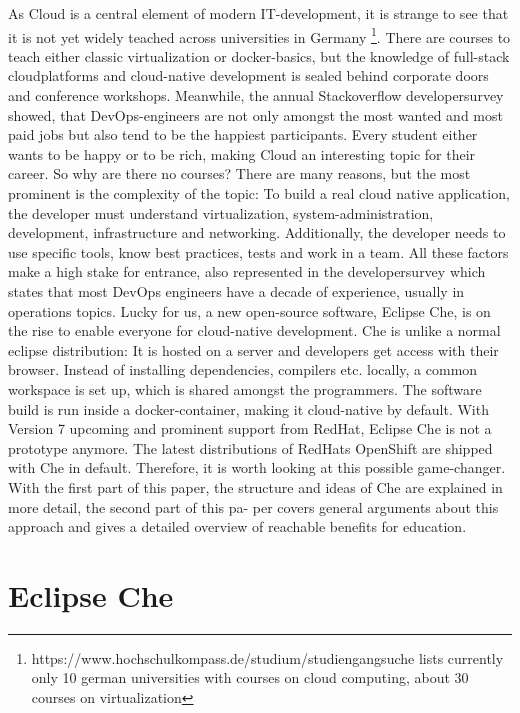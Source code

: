 \documentclass[utf8]{lni}
\begin{document}
As Cloud is a central element of modern IT-development, it is strange to see that it is not yet widely teached across 
universities in Germany \footnote{https://www.hochschulkompass.de/studium/studiengangsuche lists currently only 10 german universities with courses on cloud computing, about 30 courses on virtualization }.
There are courses to teach either classic virtualization or docker-basics, but the knowledge of full-stack cloudplatforms and cloud-native development is sealed behind corporate doors and conference workshops.
Meanwhile,  the  annual  Stackoverflow  developersurvey \cite{SO19} showed, that DevOps-engineers are not only 
amongst the most wanted and most paid jobs but also tend to be the happiest participants.  
Every student either wants to be happy or to be rich, making Cloud an interesting topic for their career. 
So why are there no courses? There are many reasons, but the most prominent is the complexity of the topic: 
To build a real cloud native application, the developer must understand virtualization, system-administration, development, 
infrastructure  and  networking. 
Additionally, the developer needs to use specific tools, know best practices, tests and work in a team.
All these factors make a high stake for entrance, also  represented in the developersurvey \cite{SO19} which states that most DevOps engineers have a decade of experience, usually in operations topics.
Lucky for us, a new open-source software, Eclipse Che, is on the rise to enable everyone for cloud-native development.
Che is unlike a normal eclipse distribution: 
It is hosted on a server and developers get access with their browser. 
Instead of installing dependencies, compilers etc. locally, a common workspace is set up, which is shared amongst the programmers. 
The software build is run inside a docker-container, making it cloud-native by default. 
With Version 7 upcoming and prominent support from RedHat, Eclipse Che is not a prototype anymore. 
The latest distributions of RedHats OpenShift are shipped with Che in default. 
Therefore, it is worth looking at this possible game-changer. 
With the first part of this paper, the structure and ideas of Che are explained in more detail, the second part of this pa-
per covers general arguments about this approach and gives a detailed overview of reachable benefits for education.    

\section{Eclipse Che}
\label{sec:Che}
\end{document}

